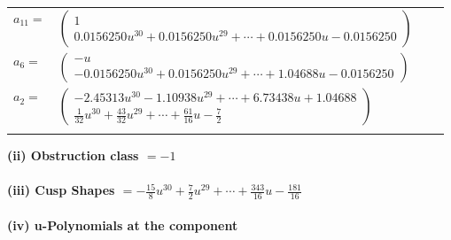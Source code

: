 \documentclass[1p]{elsarticle_modified}
\theoremstyle{definition}
\begin{document}
\begin{tabular}{m{7pt} m{180pt} m{7pt} m{180pt} }
\flushright $a_{11}=$&$\begin{pmatrix}1\\0.0156250 u^{30}+0.0156250 u^{29}+\cdots+0.0156250 u-0.0156250\end{pmatrix}$ \\
\flushright $a_{6}=$&$\begin{pmatrix}- u\\-0.0156250 u^{30}+0.0156250 u^{29}+\cdots+1.04688 u-0.0156250\end{pmatrix}$ \\
\flushright $a_{2}=$&$\begin{pmatrix}-2.45313 u^{30}-1.10938 u^{29}+\cdots+6.73438 u+1.04688\\\frac{1}{32} u^{30}+\frac{43}{32} u^{29}+\cdots+\frac{61}{16} u-\frac{7}{2}\end{pmatrix}$\\&\end{tabular}
\flushleft \textbf{(ii) Obstruction class $= -1$}\\~\\
\flushleft \textbf{(iii) Cusp Shapes $= -\frac{15}{8} u^{30}+\frac{7}{2} u^{29}+\cdots+\frac{343}{16} u-\frac{181}{16}$}\\~\\
\newpage\renewcommand{\arraystretch}{1}
\flushleft \textbf{(iv) u-Polynomials at the component}\newline \\
\end{document}

